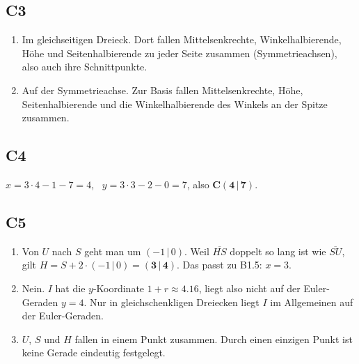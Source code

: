 \documentclass[11pt,a4paper]{article}
\begin{document}
\subsection{C3}
\begin{enumerate}
\item Im gleichseitigen Dreieck. Dort fallen Mittelsenkrechte, Winkelhalbierende, H\"ohe und Seitenhalbierende zu jeder Seite zusammen (Symmetrieachsen), also auch ihre Schnittpunkte.
\item Auf der Symmetrieachse. Zur Basis fallen Mittelsenkrechte, H\"ohe, Seitenhalbierende und die Winkelhalbierende des Winkels an der Spitze zusammen.
\end{enumerate}

\subsection{C4}
$x = 3 \cdot 4 - 1 - 7 = 4$, \ $y = 3 \cdot 3 - 2 - 0 = 7$, also $\mathbf{C(4\,|\,7)}$.

\subsection{C5}
\begin{enumerate}
\item Von $U$ nach $S$ geht man um $(-1\,|\,0)$. Weil $\overline{HS}$ doppelt so lang ist wie $\overline{SU}$, gilt $H = S + 2 \cdot (-1\,|\,0) = \mathbf{(3\,|\,4)}$. Das passt zu B1.5: $x = 3$.
\item Nein. $I$ hat die $y$-Koordinate $1 + r \approx 4.16$, liegt also nicht auf der Euler-Geraden $y = 4$. Nur in gleichschenkligen Dreiecken liegt $I$ im Allgemeinen auf der Euler-Geraden.
\item $U$, $S$ und $H$ fallen in einem Punkt zusammen. Durch einen einzigen Punkt ist keine Gerade eindeutig festgelegt.
\end{enumerate}
\end{document}
